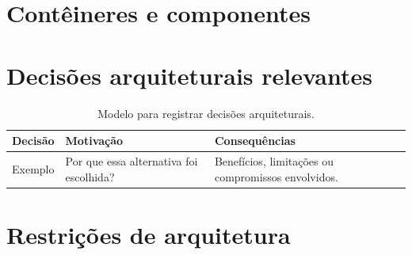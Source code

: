 \documentclass[a4paper,12pt,oneside,openany]{book}
\newif\iforientacoes
\newcommand{\orientacao}[1]{%
    \iforientacoes
        \begin{quote}
        \small\itshape\textbf{Orientação:} #1
        \end{quote}
    \fi
}
\begin{document}
\orientacao{Identifiquem o(s) estilo(s) ou padrão(ões) arquitetural(is)
adotado(s), quando aplicável, e justifiquem a escolha considerando as
características do sistema e seus objetivos de qualidade.}

\section{Contêineres e componentes}

\orientacao{Apresentem uma visão de alto nível da decomposição do sistema.
Pode-se utilizar, quando adequado, os níveis de contexto, contêiner e
componente do modelo C4. Não basta inserir os diagramas: descrevam a
responsabilidade dos elementos relevantes e as principais dependências ou
comunicações entre eles.}

%


\section{Decisões arquiteturais relevantes}

\orientacao{Registrem as decisões que tiveram impacto significativo na
arquitetura. Para cada decisão, apresentem de forma breve a motivação,
alternativas consideradas quando pertinente e principais consequências.}

\begin{table}[ht]
\centering
\caption{Modelo para registrar decisões arquiteturais.}
\begin{tabularx}{0.95\textwidth}{p{} X X}
\toprule
\textbf{Decisão} & \textbf{Motivação} & \textbf{Consequências} \\
\midrule
Exemplo & Por que essa alternativa foi escolhida? & Benefícios, limitações ou compromissos envolvidos. \\
\bottomrule
\end{tabularx}
\end{table}

\section{Restrições de arquitetura}
\end{document}
